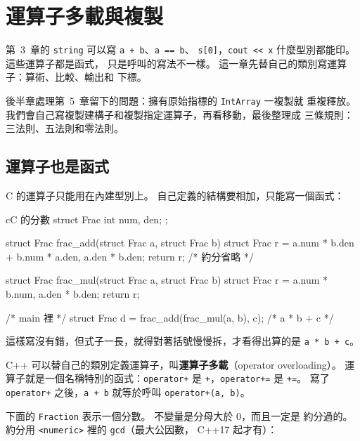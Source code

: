 \chapter{運算子多載與複製}
\label{ch:operators-copy}

第~3~章的 \texttt{string} 可以寫 \texttt{a + b}、\texttt{a == b}、
\texttt{s[0]}，\texttt{cout << x} 什麼型別都能印。 這些運算子都是函式，
只是呼叫的寫法不一樣。 這一章先替自己的類別寫運算子：算術、比較、輸出和
下標。

後半章處理第~5~章留下的問題：擁有原始指標的 \texttt{IntArray} 一複製就
重複釋放。 我們會自己寫複製建構子和複製指定運算子，再看移動，最後整理成
三條規則：三法則、五法則和零法則。

\section{運算子也是函式}
\label{sec:op-basics}

\begin{crecap}[對結構做運算的函式]
C 的運算子只能用在內建型別上。 自己定義的結構要相加，只能寫一個函式：

\begin{code}{c}{C 的分數}
struct Frac {
    int num, den;
};

struct Frac frac_add(struct Frac a, struct Frac b) {
    struct Frac r = {a.num * b.den + b.num * a.den, a.den * b.den};
    return r;          /* 約分省略 */
}

struct Frac frac_mul(struct Frac a, struct Frac b) {
    struct Frac r = {a.num * b.num, a.den * b.den};
    return r;
}

/* main 裡 */
struct Frac d = frac_add(frac_mul(a, b), c);   /* a * b + c */
\end{code}

這樣寫沒有錯，但式子一長，就得對著括號慢慢拆，才看得出算的是
\texttt{a * b + c}。
\end{crecap}

C++ 可以替自己的類別定義運算子，叫\textbf{運算子多載}（operator
overloading）。 運算子就是一個名稱特別的函式：\texttt{operator+} 是
\texttt{+}，\texttt{operator+=} 是 \texttt{+=}。 寫了 \texttt{operator+}
之後，\texttt{a + b} 就等於呼叫 \texttt{operator+(a, b)}。

下面的 \texttt{Fraction} 表示一個分數。 不變量是分母大於 $0$，而且一定是
約分過的。 約分用 \texttt{<numeric>} 裡的 \texttt{gcd}（最大公因數，
C++17 起才有）：

